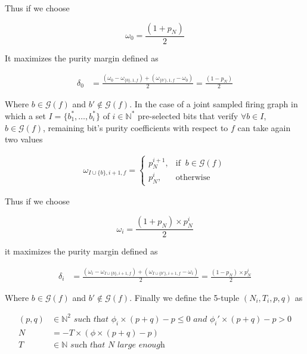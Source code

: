 \documentclass[a4paper, 11pt]{article}
\begin{document}
Thus if we choose 

\begin{equation*}
\omega_0 = \frac{(1 + p_N)}{2}
\end{equation*}

It maximizes the purity margin defined as
 
\begin{align*}
\delta_0 &=  \frac{(\omega_0 - \omega_{\{ b \}, 1, f}) + (\omega_{\{ b' \}, 1, f} - \omega_0)}{2} = \frac{(1-p_N)}{2}
\end{align*}

Where $b \in \mathcal{G}(f)$ and $b' \notin \mathcal{G}(f)$. In the case of a joint sampled firing graph in which a set $I = \{b_1^{*}, \ldots,  b_i^{*}\}$ of $i \in \mathbb{N}^{*}$ pre-selected bits that verify $\forall b \in I$, $b \in \mathcal{G}(f)$, remaining bit's purity coefficients with respect to $f$ can take again two values

\begin{align*}
\omega_{I \cup \{b\}, i+1, f} = \begin{cases} p_N^{i+1} , & \text{if }\ b \in \mathcal{G}(f) \\ p_N^{i}, & \text{otherwise} \end{cases}
\end{align*}

Thus if we choose

\begin{equation*}
\omega_i = \frac{(1 + p_N) \times p_N^{i}}{2}
\end{equation*}

it maximizes the purity margin defined as
 
\begin{align*}
\delta_i &=  \frac{(\omega_i - \omega_{I \cup \{ b \}, i+1, f}) + (\omega_{I \cup \{ b' \}, i+1, f} - \omega_i)}{2} = \frac{(1-p_N) \times p_N^{i}}{2}
\end{align*}

Where $b \in \mathcal{G}(f)$ and $b' \notin \mathcal{G}(f)$. Finally we define the 5-tuple $(N_i, T_i, p, q)$ as 

\begin{align*}
(p, q) &\in \mathbb{N}^{2} \textit{ such that } \phi_i \times (p + q) - p \leq 0 \textit{ and } \phi_i' \times (p + q) - p > 0 \\
N &= -T \times (\phi \times (p+q) - p)\\
T &\in \mathbb{N} \textit{ such that } N \textit{ large enough}
\end{align*}
\end{document}
